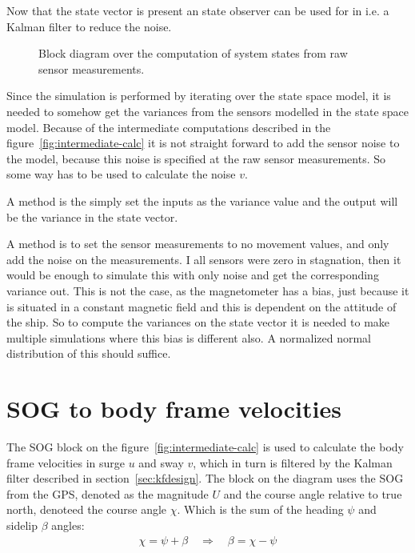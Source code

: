 Now that the state vector is present an state observer can be used for
in i.e. a Kalman filter to reduce the noise.

\begin{figure}
	\centering
	
	\caption{Block diagram over the computation of system states from
	raw sensor measurements.}
	\label{fig:intermediate-calc}
\end{figure}

Since the simulation is performed by iterating over the state space
model, it is needed to somehow get the variances from the sensors
modelled in the state space model. Because of the intermediate
computations described in the figure~\vref{fig:intermediate-calc} it
is not straight forward to add the sensor noise to the model, because
this noise is specified at the raw sensor measurements. So some way
has to be used to calculate the noise $v$.

A method is the simply set the inputs as the variance value and the
output will be the variance in the state vector. 

A method is to set the sensor measurements to no movement values, and
only add the noise on the measurements. I all sensors were zero in
stagnation, then it would be enough to simulate this with only noise and
get the corresponding variance out. This is not the case, as the
magnetometer has a bias, just because it is situated in a constant
magnetic field and this is dependent on the attitude of the ship. So
to compute the variances on the state vector it is needed to make
multiple simulations where this bias is different also. A normalized
normal distribution of this should suffice. 

\section{\acs{SOG} to body frame velocities}
The \acl{SOG} block on the figure~\vref{fig:intermediate-calc} is used to calculate the body frame velocities in surge $u$ and sway $v$, which in turn is filtered by the Kalman filter described in section~\vref{sec:kfdesign}. The block on the diagram uses the \ac{SOG} from the \ac{GPS}, denoted as the magnitude $U$ and the course angle relative to true north, denoteed the course angle $\chi$. Which is the sum of the heading $\psi$ and sidelip $\beta$ angles:
\begin{align}
\chi = \psi + \beta \quad \Rightarrow  \quad \beta = \chi - \psi
\end{align}

